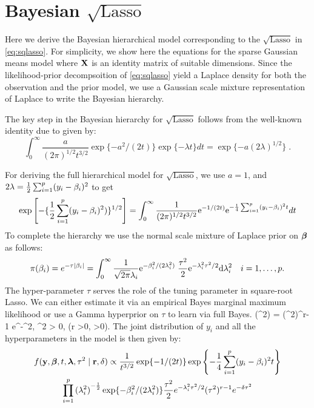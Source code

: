 \documentclass[12pt]{article}
\begin{document}
\section{Bayesian $\sqrt{\text{Lasso}}$ }

Here we derive the Bayesian hierarchical model corresponding to the $\sqrt{\text{Lasso}}$ in \eqref{eq:sqlasso}. For simplicity, we show here the equations for the sparse Gaussian means model where ${\bf X}$ is an identity matrix of suitable dimensions. Since the likelihood-prior decompsoition of \eqref{eq:sqlasso} yield a Laplace density for both the observation and the prior model, we use a Gaussian scale mixture representation of Laplace to write the Bayesian hierarchy. 

The key step in the Bayesian hierarchy for $\sqrt{\text{Lasso}}$ follows from the well-known identity due to \citet{levy1940certains} given by:
\begin{equation}
  \int_{0}^{\infty} \frac{a}{(2 \pi)^{1/2} t^{3/2}} \exp\{-{a^2}/({2 t})\} \exp\{-\lambda t\} dt = \exp\{-a (2 \lambda)^{1/2} \} \;.\label{eq:levy}
\end{equation}

For deriving the full hierarchical model for $\sqrt{\text{Lasso}}$, we use $a = 1$, and $2\lambda = \frac{1}{2} \sum_{i=1}^{p} (y_i - \beta_i)^2$ to get 
\begin{equation}
\exp \left[-\{\frac{1}{2} \sum_{i=1}^{p} (y_i - \beta_i)^2)\}^{1/2} \right] = \int_{0}^{\infty} \frac{1}{(2 \pi)^{1/2} t^{3/2}} {\rm e}^{-{1}/({2 t})} {\rm e}^{- \frac{1}{4} \sum_{i=1}^{p} (y_i - \beta_i)^2 t} dt
\end{equation}
To complete the hierarchy we use the normal scale mixture of Laplace prior on $\boldsymbol{\beta}$ as follows:
\[
\pi(\beta_i) = e^{-\tau \lvert\beta_i\rvert} = \int_{0}^{\infty} \frac{1}{\sqrt{2\pi} \lambda_i} {\rm e}^{-\beta_i^2/(2\lambda_i^2)} \; \frac{\tau^2}{2} {\rm e}^{-\lambda_i^2\tau^2/2} {\rm d} \lambda_i^2 \quad i = 1, \ldots, p.
\]
The hyper-parameter $\tau$ serves the role of the tuning parameter in square-root Lasso. We can either estimate it via an empirical Bayes marginal maximum likelihood or use a Gamma hyperprior on $\tau$ to learn via full Bayes. 
\beq
\pi(\tau^2) =  (\tau^2)^{r-1} e^{-\delta \tau^2}, \; \tau^2 > 0, \; (r >0, \delta >0).
\eeq
The joint distribution of $y_i$ and all the hyperparameters in the model is then given by:
\begin{multline}
f({\bf y}, \boldsymbol{\beta}, t, \boldsymbol{\lambda}, \tau^2 \mid {\bf r}, \delta) \propto 
\frac{1}{t^{3/2}} \exp\{-{1}/({2 t}) \} \exp \left\{- \frac{1}{4} \sum_{i=1}^{p} (y_i - \beta_i)^2 t \right\} \\
\prod_{i=1}^{p} {(\lambda_i^2)}^{-\frac{1}{2}} \exp\{-\beta_i^2/(2\lambda_i^2)\} \frac{\tau^2}{2} e^{-\lambda_i^2\tau^2/2} (\tau^2)^{r-1} e^{-\delta \tau^2}
\end{multline}
\end{document}
